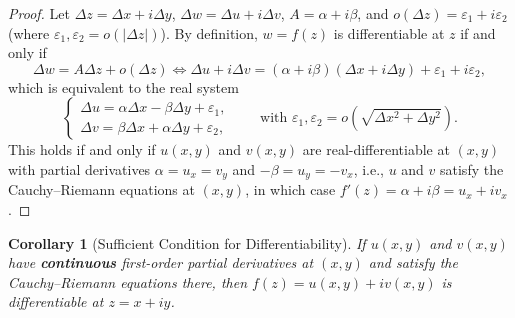 \documentclass[11pt,a4paper]{article}
\theoremstyle{definitionbreak}
\theoremstyle{examplebreak}
\theoremstyle{theorembreak}
\newtheorem{corollary}{Corollary}
\begin{document}
\begin{proof}
Let $\Delta z = \Delta x + i\Delta y$, $\Delta w = \Delta u + i\Delta v$, $A = \alpha + i\beta$, and $o(\Delta z) = \varepsilon_1 + i\varepsilon_2$ (where $\varepsilon_1, \varepsilon_2 = o(|\Delta z|)$). By definition, $w = f(z)$ is differentiable at $z$ if and only if
\[
    \Delta w = A\Delta z + o(\Delta z) \iff \Delta u + i\Delta v = (\alpha + i\beta)(\Delta x + i\Delta y) + \varepsilon_1 + i\varepsilon_2,
\]
which is equivalent to the real system
\[
    \begin{cases}
        \Delta u = \alpha \Delta x - \beta \Delta y + \varepsilon_1, \\
        \Delta v = \beta \Delta x + \alpha \Delta y + \varepsilon_2,
    \end{cases}
    \qquad \text{with } \varepsilon_1, \varepsilon_2 = o\left(\sqrt{\Delta x^2 + \Delta y^2}\right).
\]
This holds if and only if $u(x, y)$ and $v(x, y)$ are real-differentiable at $(x, y)$ with partial derivatives $\alpha = u_x = v_y$ and $-\beta = u_y = -v_x$, i.e., $u$ and $v$ satisfy the Cauchy--Riemann equations at $(x, y)$, in which case $f'(z) = \alpha + i\beta = u_x + iv_x$.
\end{proof}

\begin{corollary}[Sufficient Condition for Differentiability]
If $u(x, y)$ and $v(x, y)$ have \textbf{continuous} first-order partial derivatives at $(x, y)$ and satisfy the Cauchy--Riemann equations there, then $f(z) = u(x, y) + iv(x, y)$ is differentiable at $z = x + iy$.
\end{corollary}
\end{document}
